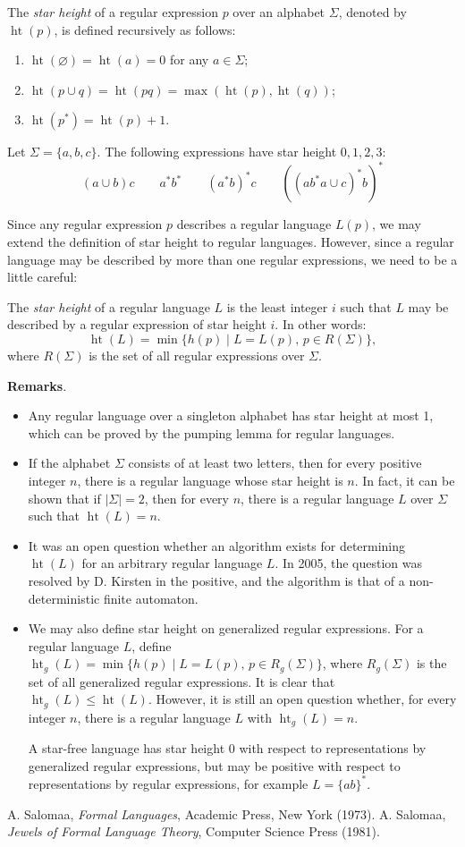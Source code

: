\documentclass[12pt]{article}
\newcommand{\h}{\operatorname{ht}}
\begin{document}
The \emph{star height} of a regular expression $p$ over an alphabet $\Sigma$, denoted by $\h(p)$, is defined recursively as follows:
\begin{enumerate}
\item $\h(\varnothing)=\h(a)=0$ for any $a\in \Sigma$;
\item $\h(p\cup q)=\h(pq)=\max(\h(p),\h(q))$;
\item $\h(p^*)=\h(p)+1$.
\end{enumerate}

Let $\Sigma=\lbrace a,b,c\rbrace$.  The following expressions have star height $0,1,2,3$:
$$ (a\cup b)c  \qquad a^*b^* \qquad (a^*b)^*c \qquad ((ab^*a \cup c)^* b)^*  $$

Since any regular expression $p$ describes a regular language $L(p)$, we may extend the definition of star height to regular languages.  However, since a regular language may be described by more than one regular expressions, we need to be a little careful:

The \emph{star height} of a regular language $L$ is the least integer $i$ such that $L$ may be described by a regular expression of star height $i$.  In other words: $$\h(L)=\min \lbrace h(p) \mid L=L(p)\mbox{, }p\in R(\Sigma) \rbrace,$$
where $R(\Sigma)$ is the set of all regular expressions over $\Sigma$.

\textbf{Remarks}.
\begin{itemize}
\item Any regular language over a singleton alphabet has star height at most 1, which can be proved by the pumping lemma for regular languages.
\item If the alphabet $\Sigma$ consists of at least two letters, then for every positive integer $n$, there is a regular language whose star height is $n$.  In fact, it can be shown that if $|\Sigma|=2$, then for every $n$, there is a regular language $L$ over $\Sigma$ such that $\h(L)=n$.
\item It was an open question whether an algorithm exists for determining $\h(L)$ for an arbitrary regular language $L$.  In 2005, the question was resolved by D. Kirsten in the positive, and the algorithm is that of a non-deterministic finite automaton.
\item We may also define star height on generalized regular expressions.  For a regular language $L$, define $\h_g(L)=\min \lbrace h(p) \mid L=L(p)\mbox{, }p\in R_g(\Sigma) \rbrace$, where $R_g(\Sigma)$ is the set of all generalized regular expressions.  It is clear that $\h_g(L)\le \h(L)$.  However, it is still an open question whether, for every integer $n$, there is a regular language $L$ with $\h_g(L)=n$.

A star-free language has star height $0$ with respect to representations by generalized regular expressions, but may be positive with respect to representations by regular expressions, for example $L=\lbrace ab\rbrace^*$.
\end{itemize}

\begin{thebibliography}{9}
 A. Salomaa, {\em Formal Languages}, Academic Press, New York (1973).
 A. Salomaa, {\em Jewels of Formal Language Theory}, Computer Science Press (1981).
\end{thebibliography}
\end{document}
